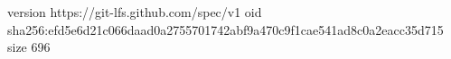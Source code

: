 version https://git-lfs.github.com/spec/v1
oid sha256:efd5e6d21c066daad0a2755701742abf9a470c9f1cae541ad8c0a2eacc35d715
size 696
